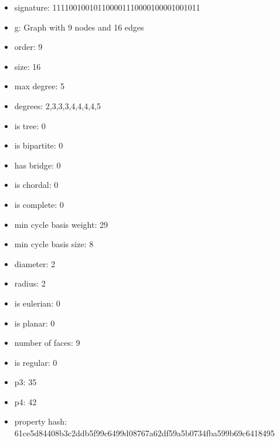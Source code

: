 \newpage
\begin{figure}
\end{figure}
\begin{itemize}
\item signature: 111100100101100001110000100001001011
\item g: Graph with 9 nodes and 16 edges
\item order: 9
\item size: 16
\item max degree: 5
\item degrees: 2,3,3,3,4,4,4,4,5
\item is tree: 0
\item is bipartite: 0
\item has bridge: 0
\item is chordal: 0
\item is complete: 0
\item min cycle basis weight: 29
\item min cycle basis size: 8
\item diameter: 2
\item radius: 2
\item is eulerian: 0
\item is planar: 0
\item number of faces: 9
\item is regular: 0
\item p3: 35
\item p4: 42
\item property hash: 61ce5d84408b3c2ddb5f99c6499d08767a62df59a5b0734fba599b69c6418495
\end{itemize}
